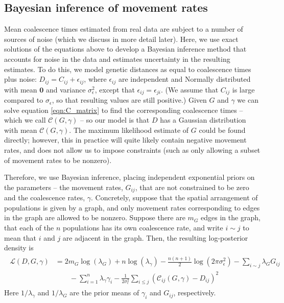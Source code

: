 \documentclass{article}
\begin{document}
\subsection*{Bayesian inference of movement rates}

Mean coalescence times estimated from real data are subject to a number of sources of noise
(which we discuss in more detail later).
Here, we use
exact solutions of the equations above
to develop a Bayesian inference method that accounts for noise in the data
and estimates uncertainty in the resulting estimates.
To do this, we model genetic distances as equal to coalescence times plus noise:
$D_{ij} = C_{ij} + \epsilon_{ij}$,
where $\epsilon_{ij}$ are independent and Normally distributed
with mean $\mathbf{0}$ and variance $\sigma_\epsilon^2$,
except that $\epsilon_{ij} = \epsilon_{ji}$.
(We assume that $C_{ij}$ is large compared to $\sigma_{\epsilon}$,
so that resulting values are still positive.)
Given $G$ and $\gamma$ we can solve equation \eqref{eqn:C_matrix} 
to find the corresponding coalescence times
-- which we call $\mathcal{C}(G, \gamma)$ --
so our model is that $D$ has a Gaussian distribution 
with mean $\mathcal{C}(G, \gamma)$.
The maximum likelihood estimate of $G$ could be found directly;
however, this in practice will quite likely contain negative movement rates,
and does not allow us to impose constraints
(such as only allowing a subset of movement rates to be nonzero).

Therefore, we use Bayesian inference,
placing independent exponential priors on the parameters --
the movement rates, $G_{ij}$, that are not constrained to be zero
and the coalescence rates, $\gamma$.
Concretely, suppose that the spatial arrangement of populations is given by a graph,
and only movement rates corresponding to edges in the graph are allowed to be nonzero.
Suppose there are $m_G$ edges in the graph,
that each of the $n$ populations has its own coalescence rate,
and write $i \sim j$ to mean that $i$ and $j$ are adjacent in the graph.
Then, the resulting log-posterior density is
\begin{align} \label{eq:post}
    \begin{split}
\mathcal{L}(D, G, \gamma) 
    &=
    2 m_G \log(\lambda_G) + n \log(\lambda_\gamma) 
    - \frac{n(n+1)}{2} \log(2 \pi \sigma^2_\epsilon)
	- \sum_{i \sim j} \lambda_G G_{ij}  \\
    &\qquad
    -\sum_{i=1}^n \lambda_{\gamma}\gamma_i
		-\frac{1}{2 \sigma_{\epsilon}^2} \sum_{i \leq j} \left(
            \mathcal{C}_{ij}(G,\gamma) - D_{ij}
        \right)^2 
    \end{split}
\end{align}
Here $1/\lambda_\gamma$ and $1/\lambda_G$ are the prior means of $\gamma_i$ and $G_{ij}$,
respectively.
\end{document}
